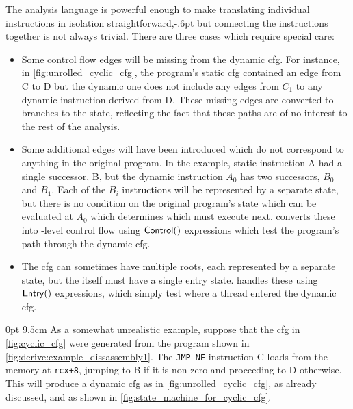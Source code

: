 The {\StateMachine} analysis language is powerful enough to make
translating individual instructions in isolation
straightforward,\kern-.6pt but connecting the instructions
together is not always trivial.  There are three cases which require
special care:
\begin{itemize}
\item
  Some control flow edges will be missing from the \gls{dynamic cfg}.
  For instance, in \autoref{fig:unrolled_cyclic_cfg}, the program's
  \gls{static cfg} contained an edge from C to D but the dynamic one
  does not include any edges from $C_1$ to any dynamic instruction
  derived from D.  These missing edges are converted to branches to
  the {\stUnreached} state, reflecting the fact that these paths are
  of no interest to the rest of the analysis.
\item
  Some additional edges will have been introduced which do not
  correspond to anything in the original program.  In the example,
  static instruction A had a single successor, B, but the dynamic
  instruction $A_0$ has two successors, $B_0$ and $B_1$.  Each of the
  $B_i$ instructions will be represented by a separate {\StateMachine}
  state, but there is no condition on the original program's state
  which can be evaluated at $A_0$ which determines which must execute
  next.  {\Technique} converts these into {\StateMachine}-level
  control flow using ${\mathsf{Control}}()$ expressions which test the
  program's path through the \gls{dynamic cfg}.
\item
  The \gls{cfg} can sometimes have multiple roots, each represented by
  a separate {\StateMachine} state, but the {\StateMachine} itself
  must have a single entry state.  {\Technique} handles these using
  $\mathsf{Entry}()$ expressions, which simply test where a thread entered
  the \gls{dynamic cfg}.
\end{itemize}

  0pt 9.5cm
\noindent As a somewhat unrealistic example, suppose that the
\gls{cfg} in \autoref{fig:cyclic_cfg} were generated from the program
shown in \autoref{fig:derive:example_dissassembly1}.  The
\texttt{JMP\_NE} instruction C loads from the memory at
\texttt{rcx+8}, jumping to B if it is non-zero and proceeding to D
otherwise.  This will produce a \gls{dynamic cfg} as in
\autoref{fig:unrolled_cyclic_cfg}, as already discussed, and
\AStateMachine{} as shown in
\autoref{fig:state_machine_for_cyclic_cfg}.

